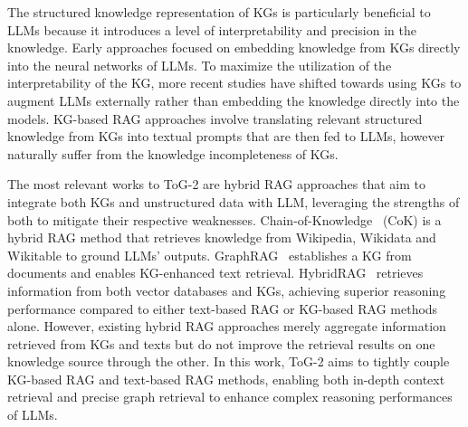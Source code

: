 \documentclass{article} %
\begin{document}
The structured knowledge representation of KGs is particularly beneficial to LLMs because it introduces a level of interpretability and precision in the knowledge. Early approaches \citep{DBLP:journals/corr/abs-2003-13956, peters2019knowledge, huang2024joint, liu2020reasoning} focused on embedding knowledge from KGs directly into the neural networks of LLMs. 
To maximize the utilization of the interpretability of the KG, more recent studies \citep{jiang2024efficientknowledgeinfusionkgllm,sun2024thinkongraphdeepresponsiblereasoning} have shifted towards using KGs to augment LLMs externally rather than embedding the knowledge directly into the models. KG-based RAG approaches involve translating relevant structured knowledge from KGs into textual prompts that are then fed to LLMs, however naturally suffer from the knowledge incompleteness of KGs. 

The most relevant works to ToG-2 are hybrid RAG approaches that aim to integrate both KGs and unstructured data with LLM, leveraging the strengths of both to mitigate their respective weaknesses. Chain-of-Knowledge~\citep{li2024cok} (CoK) is a hybrid RAG method that retrieves knowledge from Wikipedia, Wikidata and Wikitable to ground LLMs' outputs. GraphRAG~\citep{edge2024localglobalgraphrag} establishes a KG from documents and enables KG-enhanced text retrieval. HybridRAG~\citep{sarmah2024hybridrag} retrieves information from both vector databases and KGs, achieving superior reasoning performance compared to either text-based RAG or KG-based RAG methods alone. However, existing hybrid RAG approaches merely aggregate information retrieved from KGs and texts but do not improve the retrieval results on one knowledge source through the other. 
In this work, ToG-2 aims to tightly couple KG-based RAG and text-based RAG methods, enabling both in-depth context retrieval and precise graph retrieval to enhance complex reasoning performances of LLMs.
\end{document}
